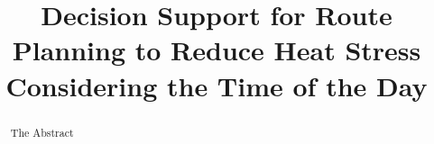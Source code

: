 \documentclass[a4paper]{scrartcl}
\title{Decision Support for Route Planning to Reduce Heat Stress Considering the Time of the Day}
\author{}
\begin{document}
\maketitle

\begin{abstract}
	The Abstract
\end{abstract}



\printbibliography
\end{document}
